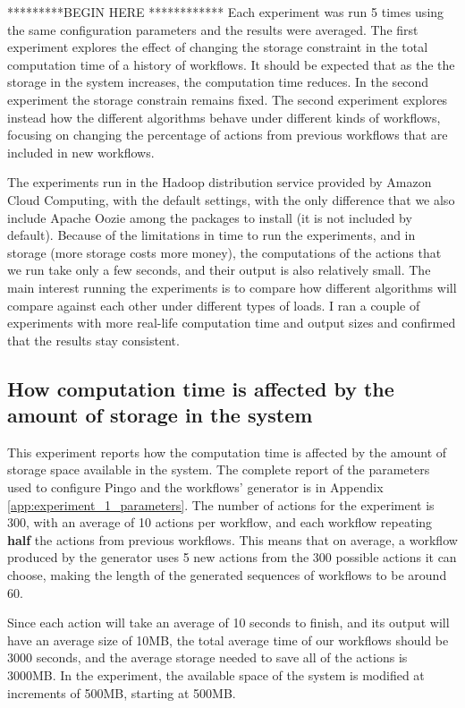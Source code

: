 *********BEGIN HERE ************
Each experiment was run 5 times using the same configuration parameters and the results were averaged.  The first experiment explores the effect of changing the storage constraint in the total computation time of a history of workflows.  It should be expected that as the the storage in the system increases, the computation time reduces.  In the second experiment the storage constrain remains fixed.  The second experiment explores instead how the different algorithms behave under different kinds of workflows, focusing on changing the percentage of actions from previous workflows that are included in new workflows.

The experiments run in the Hadoop distribution service provided by Amazon Cloud Computing, with the default settings, with the only difference that we also include Apache Oozie among the packages to install (it is not included by default).  Because of the limitations in time to run the experiments, and in storage (more storage costs more money), the computations of the actions that we run take only a few seconds, and their output is also relatively small.  The main interest running the experiments is to compare how different algorithms will compare against each other under different types of loads.  I ran a couple of experiments with more real-life computation time and output sizes and confirmed that the results stay consistent.

\subsection{How computation time is affected by the amount of storage in the system}
This experiment reports how the computation time is affected by the amount of storage space available in the system. The complete report of the parameters used to configure Pingo and the workflows' generator is in Appendix \ref{app:experiment_1_parameters}.  The number of actions for the experiment is 300, with an average of 10 actions per workflow, and each workflow repeating \textbf{half} the actions from previous workflows.  This means that on average, a workflow produced by the generator uses 5 new actions from the 300 possible actions it can choose, making the length of the generated sequences of workflows to be around 60.

Since each action will take an average of 10 seconds to finish, and its output will have an average size of 10MB, the total average time of our workflows should be 3000 seconds, and the average storage needed to save all of the actions is 3000MB.  In the experiment, the available space of the system is modified at increments of 500MB, starting at 500MB. 

